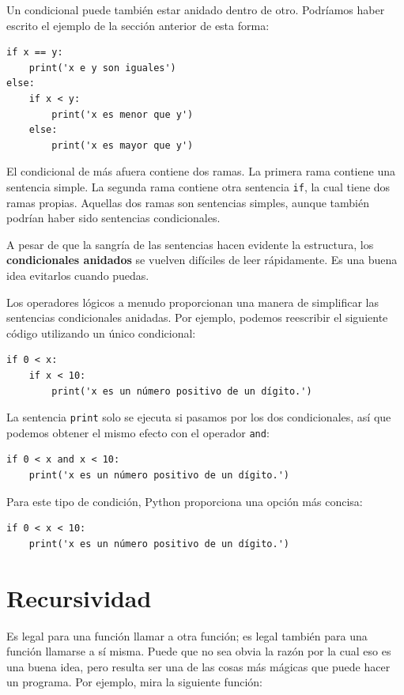 \documentclass[10pt]{book}
\begin{document}
Un condicional puede también estar anidado dentro de otro.  Podríamos haber
escrito el ejemplo de la sección anterior de esta forma:

\begin{verbatim}
if x == y:
    print('x e y son iguales')
else:
    if x < y:
        print('x es menor que y')
    else:
        print('x es mayor que y')
\end{verbatim}
%
El condicional de más afuera contiene dos ramas.  La
primera rama contiene una sentencia simple.  La segunda rama
contiene otra sentencia {\tt if}, la cual tiene dos ramas
propias.  Aquellas dos ramas son sentencias simples,
aunque también podrían haber sido sentencias condicionales.

A pesar de que la sangría de las sentencias hacen evidente la
estructura, los {\bf condicionales anidados} se vuelven difíciles de leer
rápidamente.  Es una buena idea evitarlos cuando puedas.

Los operadores lógicos a menudo proporcionan una manera de simplificar las sentencias condicionales
anidadas.  Por ejemplo, podemos reescribir el siguiente código utilizando un
único condicional:

\begin{verbatim}
if 0 < x:
    if x < 10:
        print('x es un número positivo de un dígito.')
\end{verbatim}
%
La sentencia {\tt print} solo se ejecuta si pasamos por los dos
condicionales, así que podemos obtener el mismo efecto con el operador {\tt and}:

\begin{verbatim}
if 0 < x and x < 10:
    print('x es un número positivo de un dígito.')
\end{verbatim}

Para este tipo de condición, Python proporciona una opción más concisa:

\begin{verbatim}
if 0 < x < 10:
    print('x es un número positivo de un dígito.')
\end{verbatim}


\section{Recursividad}
\label{recursion}

Es legal para una función llamar a otra función;
es legal también para una función llamarse a sí misma.  Puede que no sea obvia
la razón por la cual eso es una buena idea, pero resulta ser una de las cosas más
mágicas que puede hacer un programa.
Por ejemplo, mira la siguiente función:
\end{document}
